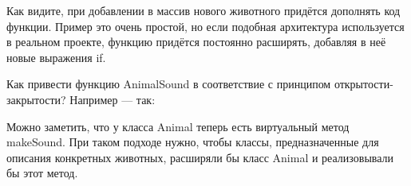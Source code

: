 \documentclass[a4paper]{article}
\begin{document}
Как видите, при добавлении в массив нового животного придётся дополнять код функции. Пример это очень простой, но если подобная архитектура используется в реальном проекте, функцию придётся постоянно расширять, добавляя в неё новые выражения if.

\newpage
Как привести функцию AnimalSound в соответствие с принципом открытости-закрытости? Например — так:

\begin{figure}[h]
\end{figure}

Можно заметить, что у класса Animal теперь есть виртуальный метод makeSound. При таком подходе нужно, чтобы классы, предназначенные для описания конкретных животных, расширяли бы класс Animal и реализовывали бы этот метод.
\end{document}
